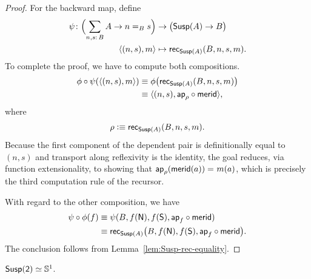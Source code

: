 \begin{proof}
    For the backward map, define
    \begin{align*}
        \psi\colon
            \Bigl(
                \sum_{n,s\colon B}A\to n\eq{B}s
            \Bigr)
            &\to
            \bigl(\fun{Susp}(A)\to B\bigr)\\
        \dep{(n,s),m}&\mapsto\fun{rec}_{\fun{Susp}(A)}
            (
                B,n,s,m
            ).
    \end{align*}
    To complete the proof, we have to compute both compositions.
    \begin{align*}
        \phi\circ\psi(\langle(n,s),m\rangle)
            &\equiv\phi
                \bigl(
                    \mathsf{rec}_{\mathsf{Susp}(A)}(B,n,s,m)
                \bigr)\\
            &\equiv\langle(n,s),\mathsf{ap}_\rho\circ\mathsf{merid}\rangle,
    \end{align*}
    where
    \[
        \rho\mathrel{\vcentcolon}\equiv\mathsf{rec}_{\mathsf{Susp}(A)}(B,n,s,m).
    \]
    Because the first component of the dependent pair is definitionally equal to $(n,s)$ and transport along reflexivity is the identity, the goal reduces, via function extensionality, to showing that $\mathsf{ap}_\rho(\mathsf{merid}(a))\mathrel{=_{}}m(a)$, which is precisely the third computation rule of the recursor.

    With regard to the other composition, we have
    \begin{align*}
        \psi\circ\phi(f)
            &\equiv\psi
                (
                    B,
                    f(\mathsf{N}),
                    f(\mathsf{S}),
                    \mathsf{ap}_f\circ\mathsf{merid}
                )\\
            &\equiv\mathsf{rec}_{\mathsf{Susp}(A)}
                \bigl(
                    B,
                    f(\mathsf{N}),
                    f(\mathsf{S}),
                    \mathsf{ap}_f\circ\mathsf{merid}
                \bigr).
    \end{align*}
    The conclusion follows from Lemma~\ref{lem:Susp-rec-equality}.
\end{proof}

\begin{lem}\label{lem:Susp(S0)=S1}
    $\mathsf{Susp}(\mathsf{2})\simeq\mathbb S^1$.
\end{lem}

